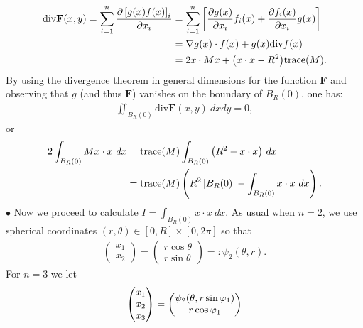 \begin{problem}
\begin{solution}
\begin{itemize}
    \begin{align*}
        \mathrm{div}\mathbf{F}(x,y) = \displaystyle\sum\limits_{i=1}^n \dfrac{\partial \left[ g(x)f(x) \right]_i}{\partial x_i} &= \displaystyle\sum\limits_{i=1}^n \left[ \dfrac{\partial g(x)}{\partial x_i}f_i(x) + \dfrac{\partial f_i (x)}{\partial x_i} g(x) \right] \\
        &= \nabla g(x) \cdot f(x) + g(x) \mathrm{div}f(x) \\
        &= 2x \cdot Mx + \big(x\cdot x - R^2\big) \mathrm{trace}(M).
    \end{align*}
    By using the divergence theorem in general dimensions for the function $\mathbf{F}$ and observing that $g$ (and thus $\mathbf{F}$) vanishes on the boundary of $B_R(0)$, one has:
    \begin{align*}
        \displaystyle\iint_{B_R(0)} \mathrm{div}\mathbf{F}(x,y)\ dxdy = 0,
    \end{align*}
    or 
    \begin{align}
        2\displaystyle\int_{B_R(0)} Mx \cdot x \ dx &= \mathrm{trace}(M) \displaystyle\int_{B_R(0)} \big( R^2 - x\cdot x \big) \ dx \notag \\
        &= \mathrm{trace}(M) \left( R^2 \left|B_R(0)\right| - \displaystyle\int_{B_R(0)} x\cdot x \ dx \right). \label{eq:prob6-1}
    \end{align}
    $\bullet$ Now we proceed to calculate $I= \displaystyle\int_{B_R(0)} x\cdot x \ dx$. As usual when $n=2$, we use spherical coordinates $(r,\theta)\in [0,R]\times [0,2\pi]$ so that 
    \begin{align*}
        \begin{pmatrix}
            x_1 \\ x_2
        \end{pmatrix} 
        = \begin{pmatrix}
            r\cos\theta \\
            r\sin\theta 
        \end{pmatrix}
        =: \psi_2 (\theta,r).
    \end{align*}
    For $n=3$ we let 
    \begin{align*}
        \begin{pmatrix}
            x_1 \\ x_2 \\ x_3 
        \end{pmatrix}
        = 
        \begin{pmatrix}
            \psi_2 (\theta, r\sin\varphi_1) \\
            r\cos\varphi_1

\end{pmatrix}
\end{align*}
\end{itemize}
\end{solution}
\end{problem}
